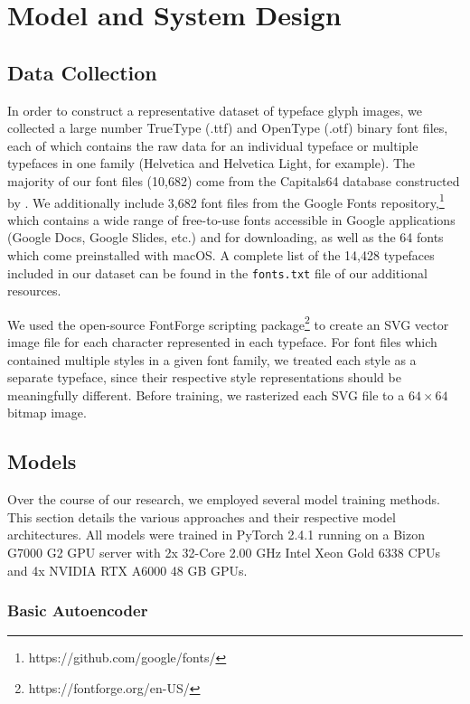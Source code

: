 \chapter{Model and System Design}
\label{chap:methodology}

\section{Data Collection}

In order to construct a representative dataset of typeface glyph images, we collected a large number TrueType (.ttf) and OpenType (.otf) binary font files, each of which contains the raw data for an individual typeface or multiple typefaces in one family (Helvetica and Helvetica Light, for example). The majority of our font files (10,682) come from the Capitals64 database constructed by \cite{azadi2017}. We additionally include 3,682 font files from the Google Fonts repository,\footnote{https://github.com/google/fonts/} which contains a wide range of free-to-use fonts accessible in Google applications (Google Docs, Google Slides, etc.) and for downloading, as well as the 64 fonts which come preinstalled with macOS. A complete list of the 14,428 typefaces included in our dataset can be found in the \texttt{fonts.txt} file of our additional resources.

We used the open-source FontForge scripting package\footnote{https://fontforge.org/en-US/} to create an SVG vector image file for each character represented in each typeface. For font files which contained multiple styles in a given font family, we treated each style as a separate typeface, since their respective style representations should be meaningfully different. Before training, we rasterized each SVG file to a $64\times64$ bitmap image.

\section{Models}

Over the course of our research, we employed several model training methods. This section details the various approaches and their respective model architectures. All models were trained in PyTorch 2.4.1 running on a Bizon G7000 G2 GPU server with 2x 32-Core 2.00 GHz Intel Xeon Gold 6338 CPUs and 4x NVIDIA RTX A6000 48 GB GPUs.

\subsection{Basic Autoencoder} \label{basic-autoencoder}


